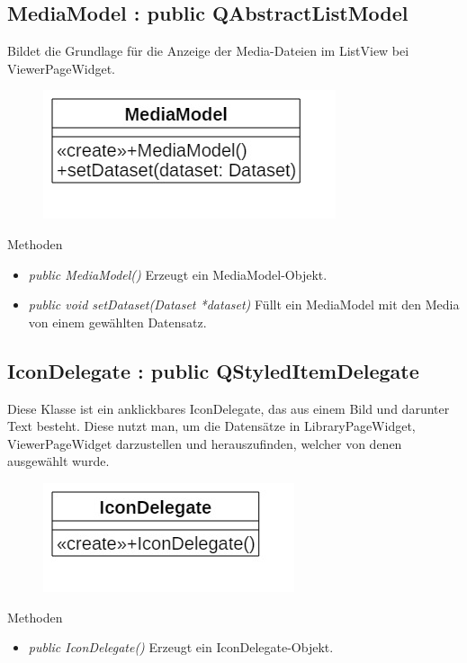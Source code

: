 \subsection*{MediaModel : public QAbstractListModel}
Bildet die Grundlage für die Anzeige der Media-Dateien im ListView bei ViewerPageWidget.

\begin{figure}[H]
	\centering
	\includegraphics[scale=0.5]{img/Klassendiagramm/Klassen/View/MediaModel}
	\label{fig:mediaModel}
\end{figure}

Methoden
\begin{itemize}
	\item\textit{public MediaModel()}
	Erzeugt ein MediaModel-Objekt.
	\item\textit{public void setDataset(Dataset *dataset)}
	Füllt ein MediaModel mit den Media von einem gewählten Datensatz.
\end{itemize}

\subsection*{IconDelegate : public QStyledItemDelegate}
Diese Klasse ist ein anklickbares IconDelegate, das aus einem Bild und darunter Text besteht. Diese nutzt man, um die Datensätze in LibraryPageWidget, ViewerPageWidget darzustellen und herauszufinden, welcher von denen ausgewählt wurde.

\begin{figure}[H]
	\centering
	\includegraphics[scale=0.5]{img/Klassendiagramm/Klassen/View/IconDelegate}
	\label{fig:iconDelegate}
\end{figure}

Methoden
\begin{itemize}
	\item\textit{public IconDelegate()}
	Erzeugt ein IconDelegate-Objekt.
\end{itemize}

